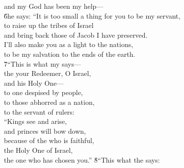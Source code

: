 \begin{poetry}
\poemll    and my God has been my help--- \\
\poeml \v{6}he says: ``It is too small a thing for you to be my servant, \\
\poemll    to raise up the tribes of Israel \\
\poemlll       and bring back those of Jacob I have preserved. \\
\poeml I'll also make you as a light to the nations, \\
\poemll    to be my salvation to the ends of the earth. \\
\poeml \v{7}``This is what my  says--- \\
\poemll    the  your Redeemer, O Israel, \\
\poemlll       and his Holy One--- \\
\poeml to one despised by people, \\
\poemll    to those abhorred as a nation, \\
\poemlll       to the servant of rulers: \\
\poeml ``Kings see and arise, \\
\poemll    and princes will bow down, \\
\poeml because of the  who is faithful, \\
\poemll    the Holy One of Israel, \\
\poemlll       the one who has chosen you.''
\poeml \v{8}``This what the  says: \\

\end{poetry}

